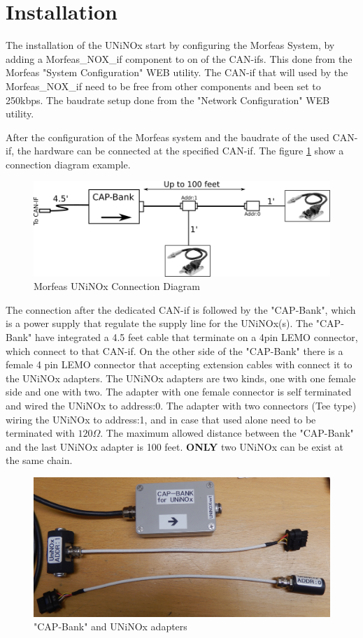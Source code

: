 \section{Installation}
The installation of the UNiNOx start by configuring the Morfeas System, by adding a Morfeas\_NOX\_if component to on of the CAN-ifs.
This done from the Morfeas "System Configuration" WEB utility.
The CAN-if that will used by the Morfeas\_NOX\_if need to be free from other components and been set to 250kbps.
The baudrate setup done from the "Network Configuration" WEB utility.

After the configuration of the Morfeas system and the baudrate of the used CAN-if, the hardware can be connected at the specified CAN-if.
The figure \ref{fig:NOX_conn} show a connection diagram example.

\begin{figure}[h]
\centering
	\includegraphics[width=5in,angle=0]{../art/Morfeas_web_if/connection_diagram.png}
	\caption{Morfeas UNiNOx Connection Diagram}
	\label{fig:NOX_conn}
\end{figure}

The connection after the dedicated CAN-if is followed by the "CAP-Bank",
which is a power supply that regulate the supply line for the UNiNOx(s).
The "CAP-Bank" have integrated a 4.5 feet cable that terminate on a 4pin LEMO connector, which connect to that CAN-if.
On the other side of the "CAP-Bank" there is a female 4 pin LEMO connector that accepting extension cables with connect it to
the UNiNOx adapters. The UNiNOx adapters are two kinds, one with one female side and one with two.
The adapter with one female connector is self terminated and wired the UNiNOx to address:0.
The adapter with two connectors (Tee type) wiring the UNiNOx to address:1, and in case that used alone need to be terminated with $120\Omega$.
The maximum allowed distance between the "CAP-Bank" and the last UNiNOx adapter is 100 feet. 
\textbf{ONLY} two UNiNOx can be exist at the same chain.

\begin{figure}[h]
\centering
	\includegraphics[width=5in,angle=0]{../art/Morfeas_web_if/UniNOx_adapters.png}
	\caption{"CAP-Bank" and UNiNOx adapters}
\end{figure}

